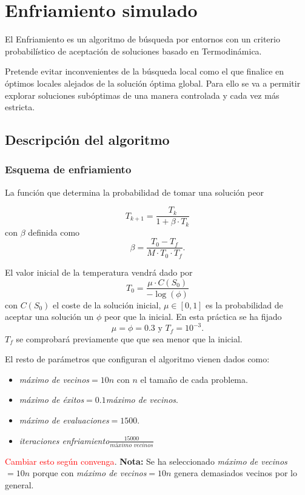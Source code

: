 
\section{Enfriamiento simulado}

El Enfriamiento es un algoritmo de búsqueda por entornos con un criterio probabilístico de aceptación de soluciones basado en Termodinámica. 

Pretende evitar inconvenientes de la búsqueda local 
como el que finalice en óptimos locales
alejados de la solución óptima global. Para ello se 
va a permitir explorar soluciones subóptimas de una manera
controlada y cada vez más estricta. 

\subsection{Descripción del algoritmo} 

\subsubsection{Esquema de enfriamiento} 
La función que determina la probabilidad de tomar una solución peor 

\begin{equation*}
    T_{k+1} = \frac{T_k}{1 + \beta \cdot T_k}
\end{equation*}
con $\beta$ definida como 
\begin{equation*}
    \beta = \frac{T_0 - T_f}{M \cdot T_0 \cdot T_f}. 
\end{equation*}

El valor inicial de la temperatura vendrá dado por 
\begin{equation*}
    T_0 = \frac{\mu \cdot C(S_0)}{- \log (\phi)}
\end{equation*}
con $C(S_0)$ el coste de la solución inicial,
$\mu  \in [0,1]$ es la probabilidad de aceptar una solución un $\phi$ peor que la inicial. 
En esta práctica se ha fijado 
\begin{equation*}
    \mu = \phi = 0.3 \text{  y } T_f = 10^{-3}.
\end{equation*}
$T_f$ se comprobará previamente que que sea menor que la inicial. 

El resto de parámetros que configuran el algoritmo vienen
dados como: 
\begin{itemize}
    \item \textit{máximo de vecinos}$= 10 n$ con $n$ el tamaño de cada problema. 
    \item \textit{máximo de éxitos}$= 0.1$\textit{máximo de vecinos}.
    \item \textit{máximo de evaluaciones}$=1500$.
    \item \textit{iteraciones enfriamiento}$\frac{15000}{\textit{máximo vecinos}}$ 
\end{itemize}
\textcolor{red}{Cambiar esto según convenga}.
\textbf{Nota: }Se ha seleccionado \textit{máximo de vecinos}$= 10 n$ porque con \textit{máximo de vecinos}$= 10 n$ genera demasiados vecinos por lo general. 